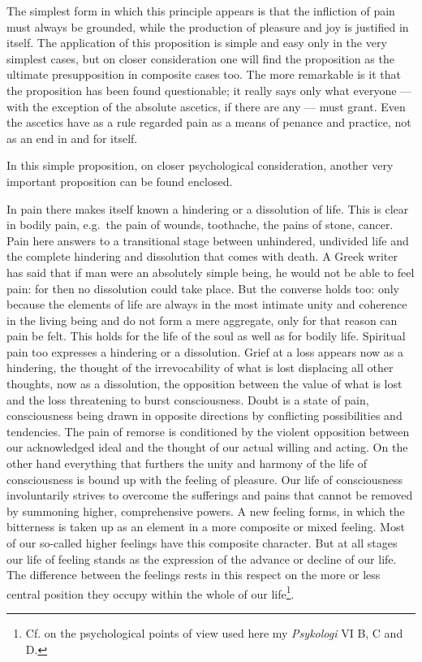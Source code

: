 \documentclass[12pt,a4paper,openany]{book}
\newcommand{\opage}[1]{\marginnote{\footnotesize\textit{[#1]}}}
\begin{document}
The simplest form in which this principle appears is that the infliction of pain must always be grounded, while
the production of pleasure and joy is justified in itself. The application of this proposition is simple and
easy only in the very simplest cases, but on closer consideration one will find the proposition as the ultimate
presupposition in composite cases too. The more remarkable is it that the proposition has been found
questionable; it really says only what everyone --- with the exception of the absolute ascetics, if there are
any --- must grant. Even the ascetics have as a rule regarded pain as a means of penance and practice, not as an
end in and for itself.

\opage{173}In this simple proposition, on closer psychological consideration, another very important proposition can
be found enclosed.

In pain there makes itself known a hindering or a dissolution of life. This is clear in bodily pain, e.g.\ the
pain of wounds, toothache, the pains of stone, cancer. Pain here answers to a transitional stage between
unhindered, undivided life and the complete hindering and dissolution that comes with death. A Greek writer has
said that if man were an absolutely simple being, he would not be able to feel pain: for then no dissolution
could take place. But the converse holds too: only because the elements of life are always in the most intimate
unity and coherence in the living being and do not form a mere aggregate, only for that reason can pain be felt.
This holds for the life of the soul as well as for bodily life. Spiritual pain too expresses a hindering or a
dissolution. Grief at a loss appears now as a hindering, the thought of the irrevocability of what is lost
displacing all other thoughts, now as a dissolution, the opposition between the value of what is lost and the
loss threatening to burst consciousness. Doubt is a state of pain, consciousness being drawn in opposite
directions by conflicting possibilities and tendencies. The pain of remorse is conditioned by the violent
opposition between our acknowledged ideal and the thought of our actual willing and acting. On the other hand
everything that furthers the unity and harmony of the life of consciousness is bound up with the feeling of
pleasure. Our life of consciousness involuntarily strives to overcome the sufferings and pains that cannot be
removed by summoning higher, comprehensive powers. A new feeling forms, in which the bitterness is taken up as an
element in a more composite or mixed feeling. Most of our so-called higher feelings have this composite
character. But at all stages our life of feeling stands as the expression of the advance or decline of our life.
The difference between the feelings rests in this respect on the more or less central position they occupy
within the whole of our life\footnote[1]{Cf. on the psychological points of view used here my
\textit{Psykologi} VI B, C and D.}.
\end{document}

